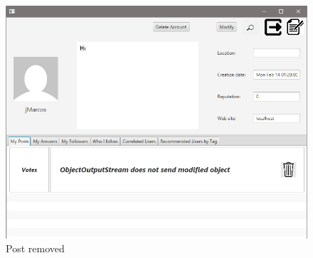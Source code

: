 \documentclass[11pt]{report}
\begin{document}
\begin{figure}[H]
  \centering
  \includegraphics[width=\textwidth,keepaspectratio=true]{img/user_manual/RimuoverePost3.png}
  \caption{Post removed}
  \label{fig:RimuoverePost3}
\end{figure}
\end{document}
